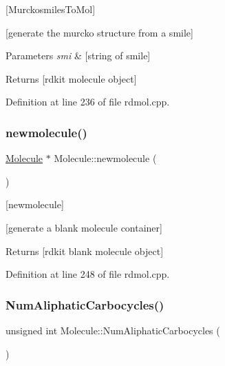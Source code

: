 \mbox{[}Murckosmiles\+To\+Mol\mbox{]} 

\mbox{[}generate the murcko structure from a smile\mbox{]}


\begin{DoxyParams}{Parameters}
{\em smi} & \mbox{[}string of smile\mbox{]} \\
\hline
\end{DoxyParams}
\begin{DoxyReturn}{Returns}
\mbox{[}rdkit molecule object\mbox{]} 
\end{DoxyReturn}


Definition at line 236 of file rdmol.\+cpp.

\mbox{\label{class_molecule_ab7813a959f80b5291f43f6b84b775ff5}} 
\subsubsection{\texorpdfstring{newmolecule()}{newmolecule()}}
{\footnotesize\ttfamily \mbox{\hyperlink{class_molecule}{Molecule}} $\ast$ Molecule\+::newmolecule (\begin{DoxyParamCaption}{ }\end{DoxyParamCaption})\hspace{0.3cm}{\ttfamily [static]}}



\mbox{[}newmolecule\mbox{]} 

\mbox{[}generate a blank molecule container\mbox{]}

\begin{DoxyReturn}{Returns}
\mbox{[}rdkit blank molecule object\mbox{]} 
\end{DoxyReturn}


Definition at line 248 of file rdmol.\+cpp.

\mbox{\label{class_molecule_a4953b86e7456967bb605bdb61c15b1aa}} 
\subsubsection{\texorpdfstring{Num\+Aliphatic\+Carbocycles()}{NumAliphaticCarbocycles()}}
{\footnotesize\ttfamily unsigned int Molecule\+::\+Num\+Aliphatic\+Carbocycles (\begin{DoxyParamCaption}{ }\end{DoxyParamCaption})}



